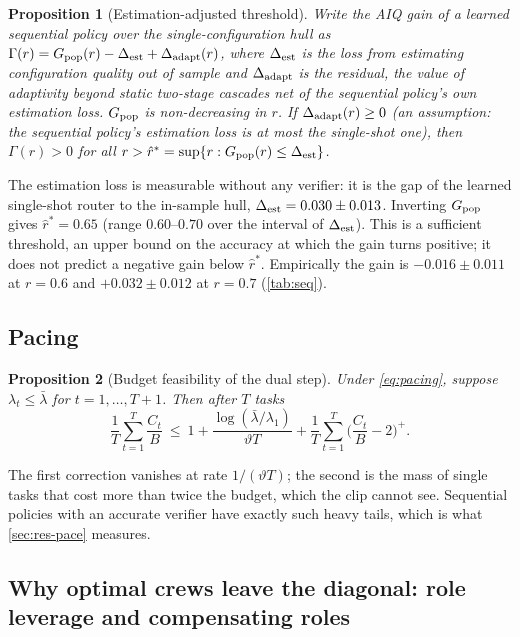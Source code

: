 \documentclass[11pt,a4paper]{article}
\newtheorem{proposition}{Proposition}
\theoremstyle{definition}
\theoremstyle{remark}
\theoremstyle{definition}
\begin{document}
\begin{proposition}[Estimation-adjusted threshold]
\label{prop:est}
Write the AIQ gain of a learned sequential policy over the single-configuration hull as $\Gamma(r)=G_{\rm pop}(r)-\Delta_{\rm est}+\Delta_{\rm adapt}(r)$, where $\Delta_{\rm est}$ is the loss from estimating configuration quality out of sample and $\Delta_{\rm adapt}$ is the residual, the value of adaptivity beyond static two-stage cascades net of the sequential policy's own estimation loss. $G_{\rm pop}$ is non-decreasing in $r$. If $\Delta_{\rm adapt}(r)\ge0$ (an assumption: the sequential policy's estimation loss is at most the single-shot one), then $\Gamma(r)>0$ for all $r>\hat r^\ast=\sup\{r:G_{\rm pop}(r)\le\Delta_{\rm est}\}$.
\end{proposition}
The estimation loss is measurable without any verifier: it is the gap of the learned single-shot router to the in-sample hull, $\Delta_{\rm est}=0.030\pm0.013$. Inverting $G_{\rm pop}$ gives $\hat r^\ast=0.65$ (range $0.60$--$0.70$ over the interval of $\Delta_{\rm est}$). This is a sufficient threshold, an upper bound on the accuracy at which the gain turns positive; it does not predict a negative gain below $\hat r^\ast$. Empirically the gain is $-0.016\pm0.011$ at $r=0.6$ and $+0.032\pm0.012$ at $r=0.7$ (\cref{tab:seq}).

\subsection{Pacing}

\begin{proposition}[Budget feasibility of the dual step]
\label{prop:pace}
Under \eqref{eq:pacing}, suppose $\lambda_t\le\bar\lambda$ for $t=1,\dots,T+1$. Then after $T$ tasks
\[
\frac1T\sum_{t=1}^T\frac{C_t}{B}\ \le\ 1+\frac{\log(\bar\lambda/\lambda_1)}{\vartheta T}+\frac1T\sum_{t=1}^T\Big(\frac{C_t}{B}-2\Big)^+ .
\]
\end{proposition}
The first correction vanishes at rate $1/(\vartheta T)$; the second is the mass of single tasks that cost more than twice the budget, which the clip cannot see. Sequential policies with an accurate verifier have exactly such heavy tails, which is what \cref{sec:res-pace} measures.

\subsection{Why optimal crews leave the diagonal: role leverage and compensating roles}
\label{sec:leverage}
\end{document}
